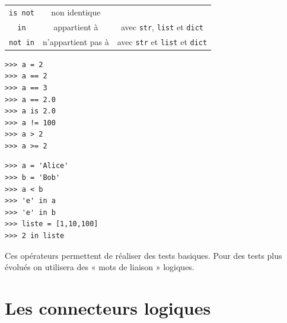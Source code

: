 {\begin{tabular}{CCC}
	\texttt{is not} & non identique         &                                                                                                                         \\
	
	\texttt{in}     & appartient à          & avec \texttt{str}, \texttt{list} et \texttt{dict}                                   \\
	
	\texttt{not in} & n'appartient pas à    & avec \texttt{str} et \texttt{list} et \texttt{dict}                                 \\
\end{tabular}
}\normalsize

\begin{pyc}
	\begin{verbatim}
>>> a = 2
>>> a == 2
>>> a == 3
>>> a == 2.0
>>> a is 2.0
>>> a != 100
>>> a > 2
>>> a >= 2
    \end{verbatim}
\end{pyc}

\begin{pyc}
	\begin{verbatim}
>>> a = 'Alice'
>>> b = 'Bob'
>>> a < b
>>> 'e' in a
>>> 'e' in b
>>> liste = [1,10,100]
>>> 2 in liste
    \end{verbatim}
\end{pyc}

Ces opérateurs permettent de réaliser des tests basiques. Pour des tests plus évolués on utilisera des  «  mots de liaison  »  logiques.

\section{Les connecteurs logiques}

